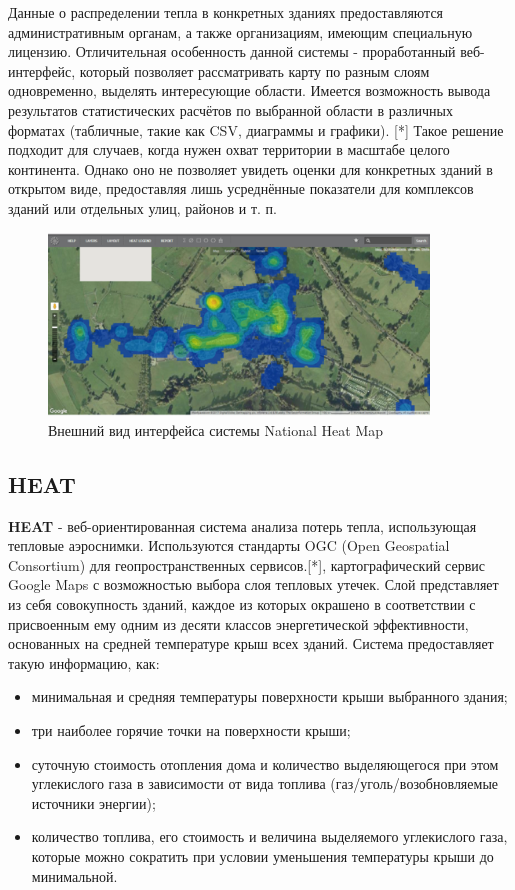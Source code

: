  	Данные о распределении тепла в конкретных зданиях предоставляются административным органам, а также организациям, имеющим специальную лицензию. Отличительная особенность данной системы - проработанный веб-интерфейс, который позволяет рассматривать карту по разным слоям одновременно, выделять интересующие области. Имеется возможность вывода результатов статистических расчётов по выбранной области в различных форматах (табличные, такие как {CSV}, диаграммы и графики). [*] Такое решение подходит для случаев, когда нужен охват территории в масштабе целого континента. Однако оно не позволяет увидеть оценки для конкретных зданий в открытом виде, предоставляя лишь усреднённые показатели для комплексов зданий или отдельных улиц, районов и т. п.

 	\begin{figure}[h!]
      \centering
      \includegraphics[width=0.9\textwidth]{images/screens/1_nhm.png}
      \caption{Внешний вид интерфейса системы National Heat Map}
      \label{screens:nhm}
    \end{figure}

\subsection{HEAT}

\par
	\textbf{HEAT} - веб-ориентированная система анализа потерь тепла, использующая тепловые аэроснимки. Используются стандарты {OGC} (Open Geospatial Consortium) для геопространственных сервисов.[*], картографический сервис {Google Maps} с возможностью выбора слоя тепловых утечек. Слой представляет из себя совокупность зданий, каждое из которых окрашено в соответствии с присвоенным ему одним из десяти классов энергетической эффективности, основанных на средней температуре крыш всех зданий. Система предоставляет такую информацию, как:

	\begin{itemize}
		\item минимальная и средняя температуры поверхности крыши выбранного здания;
		\item три наиболее горячие точки на поверхности крыши;
		\item суточную стоимость отопления дома и количество выделяющегося при этом углекислого газа в зависимости от вида топлива (газ/уголь/возобновляемые источники энергии);
		\item количество топлива, его стоимость и величина выделяемого углекислого газа, которые можно сократить при условии уменьшения температуры крыши до минимальной.
	\end{itemize}

